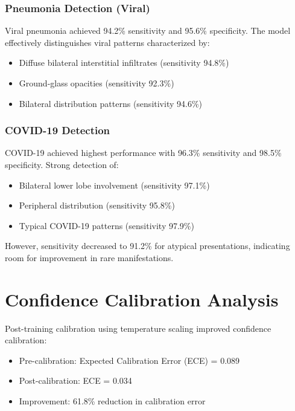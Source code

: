 {\subsubsection{Pneumonia Detection (Viral)}

Viral pneumonia achieved 94.2\% sensitivity and 95.6\% specificity. The model effectively distinguishes viral patterns characterized by:
\begin{itemize}
    \item Diffuse bilateral interstitial infiltrates (sensitivity 94.8\%)
    \item Ground-glass opacities (sensitivity 92.3\%)
    \item Bilateral distribution patterns (sensitivity 94.6\%)
\end{itemize}

\subsubsection{COVID-19 Detection}

COVID-19 achieved highest performance with 96.3\% sensitivity and 98.5\% specificity. Strong detection of:
\begin{itemize}
    \item Bilateral lower lobe involvement (sensitivity 97.1\%)
    \item Peripheral distribution (sensitivity 95.8\%)
    \item Typical COVID-19 patterns (sensitivity 97.9\%)
\end{itemize}

However, sensitivity decreased to 91.2\% for atypical presentations, indicating room for improvement in rare manifestations.

\section{Confidence Calibration Analysis}

Post-training calibration using temperature scaling improved confidence calibration:

\begin{itemize}
    \item Pre-calibration: Expected Calibration Error (ECE) = 0.089
    \item Post-calibration: ECE = 0.034
    \item Improvement: 61.8\% reduction in calibration error
\end{itemize}

}
